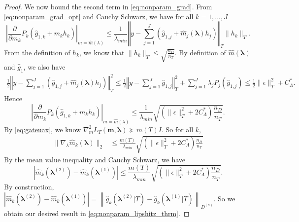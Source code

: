 \documentclass[10pt]{book}
\theoremstyle{definition}
\begin{document}
\begin{proof}
	We now bound the second term in \eqref{eq:nonparam_grad}.
	From \eqref{eq:nonparam_grad_opt} and Cauchy Schwarz, we have for all $k=1,...,J$
	\begin{equation}
	\left|\frac{\partial}{\partial m_{k}}P_{k}(\hat{g}_{1,k}+m_{k}h_{k})\right|_{m=\hat{m}(\lambda)}
	\le 
	\frac{1}{\lambda_{min}}
	\left\Vert y-\sum_{j=1}^{J}\left(\hat{g}_{1,j}+\hat{m}_{j}(\boldsymbol{\lambda})h_{j}\right)
	\right\Vert _{T}\|h_{k}\|_{T}.
	\end{equation}
	From the definition of $h_k$, we know that $\|h_{k}\|_{T} \le \sqrt{\frac{n_{D}}{n_{T}}}$.
	By definition of $\hat{m}(\boldsymbol{\lambda})$ and $\hat{g}_{1}$, we also have
	\begin{align*}
	\frac{1}{2}\left\Vert y-\sum_{j=1}^{J}\left(\hat{g}_{1,j}+\hat{m}_{j}(\boldsymbol{\lambda})h_{j}\right)\right\Vert _{T}^{2}
	\le
	\frac{1}{2}
	\left\Vert y-\sum_{j=1}^{J}\hat{g}_{1,j}\right\Vert _{T}^{2}
	+\sum_{j=1}^{J}\lambda_{j}P_{j}(\hat{g}_{1,j})
	\le \frac{1}{2} \|\epsilon\|_T^2 + C^*_\Lambda.
	\end{align*}
	Hence
	\begin{equation}
	\left|\frac{\partial}{\partial m_{k}}P_{k}(\hat{g}_{1,k}+m_{k}h_{k})\right|_{m=\hat{m}(\lambda)}
	\le
	\frac{1}{\lambda_{min}}
	\sqrt{
		\left(
		\|\epsilon\|_T^2 + 2 C^*_\Lambda
		\right)
		\frac{n_{D}}{n_{T}}
	}.
	\end{equation}
	By \eqref{eq:gateuax}, we know $\nabla_{m}^2 L_T(\boldsymbol{m}, \boldsymbol{\lambda}) \succeq m(T)I$.
	So for all $k$,
	\begin{align}
	\|\nabla_{\lambda}\hat{m}_{k}(\boldsymbol{\lambda})\|_2
	& \le
	\frac{m(T)}{\lambda_{min}}
	\sqrt{
		\left(
		\|\epsilon\|_T^2 + 2 C^*_\Lambda
		\right)
		\frac{n_{D}}{n_{T}}
	}
	\end{align}
	By the mean value inequality and Cauchy Schwarz, we have
	\begin{equation}
	\left|\hat{m}_{k}(\boldsymbol{\lambda}^{(2)})-\hat{m}_{k}(\boldsymbol{\lambda}^{(1)})\right| 
	\le
	\frac{m(T)}{\lambda_{min}}
	\sqrt{
		\left(
		\|\epsilon\|_T^2 + 2 C^*_\Lambda
		\right)
		\frac{n_{D}}{n_{T}}
	}.
	\end{equation}
	By construction,
	$
	\left|
	\hat{m}_k(\boldsymbol{\lambda}^{(2)})-\hat{m}_k(\boldsymbol{\lambda}^{(1)})
	\right|  =
	\left \| 
	\hat{g}_k(\boldsymbol{\lambda}^{(2)}|T)-\hat{g}_k(\boldsymbol{\lambda}^{(1)}|T)
	\right  \|_{D^{(n)}}
	$.
	So we obtain our desired result in \eqref{eq:nonparam_lipshitz_thrm}.
\end{proof}
\end{document}
